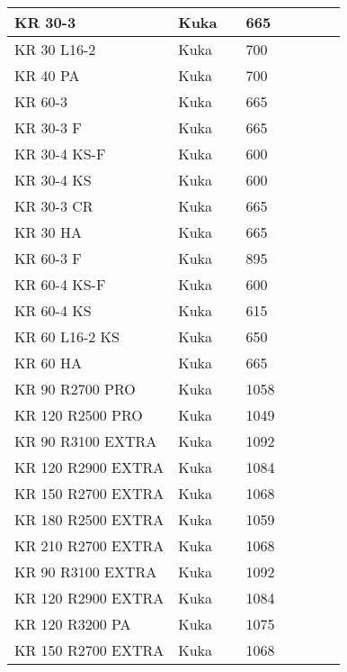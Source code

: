 \begin{longtable}{|p{}|p{}|p{}|p{}|p{}|p{}|p{}|p{}|}
KR 30-3 & Kuka &  & \cellcolor{red} 665 &  &  &  &  \\ \hline
KR 30 L16-2 & Kuka &  & \cellcolor{red} 700 &  &  &  &  \\ \hline
KR 40 PA & Kuka &  & \cellcolor{red} 700 &  &  &  &  \\ \hline
KR 60-3 & Kuka &  & \cellcolor{red} 665 &  &  &  &  \\ \hline
KR 30-3 F & Kuka &  & \cellcolor{red} 665 &  &  &  &  \\ \hline
KR 30-4 KS-F & Kuka &  & \cellcolor{red} 600 &  &  &  &  \\ \hline
KR 30-4 KS & Kuka &  & \cellcolor{red} 600 &  &  &  &  \\ \hline
KR 30-3 CR & Kuka &  & \cellcolor{red} 665 &  &  &  &  \\ \hline
KR 30 HA & Kuka &  & \cellcolor{red} 665 &  &  &  &  \\ \hline
KR 60-3 F & Kuka &  & \cellcolor{red} 895 &  &  &  &  \\ \hline
KR 60-4 KS-F & Kuka &  & \cellcolor{red} 600 &  &  &  &  \\ \hline
KR 60-4 KS & Kuka &  & \cellcolor{red} 615 &  &  &  &  \\ \hline
KR 60 L16-2 KS & Kuka &  & \cellcolor{red} 650 &  &  &  &  \\ \hline
KR 60 HA  & Kuka &  & \cellcolor{red} 665 &  &  &  &  \\ \hline
KR 90 R2700 PRO & Kuka &  & \cellcolor{red} 1058 &  &  &  &  \\ \hline
KR 120 R2500 PRO & Kuka &  & \cellcolor{red} 1049 &  &  &  &  \\ \hline
KR 90 R3100 EXTRA & Kuka &  & \cellcolor{red} 1092 &  &  &  &  \\ \hline
KR 120 R2900 EXTRA & Kuka &  & \cellcolor{red} 1084 &  &  &  &  \\ \hline
KR 150 R2700 EXTRA & Kuka &  & \cellcolor{red} 1068 &  &  &  &  \\ \hline
KR 180 R2500 EXTRA & Kuka &  & \cellcolor{red} 1059 &  &  &  &  \\ \hline
KR 210 R2700 EXTRA & Kuka &  & \cellcolor{red} 1068 &  &  &  &  \\ \hline
KR 90 R3100 EXTRA & Kuka &  & \cellcolor{red} 1092 &  &  &  &  \\ \hline
KR 120 R2900 EXTRA & Kuka &  & \cellcolor{red} 1084 &  &  &  &  \\ \hline
KR 120 R3200 PA & Kuka &  & \cellcolor{red} 1075 &  &  &  &  \\ \hline
KR 150 R2700 EXTRA & Kuka &  & \cellcolor{red} 1068 &  &  &  &  \\ \hline

\end{longtable}
